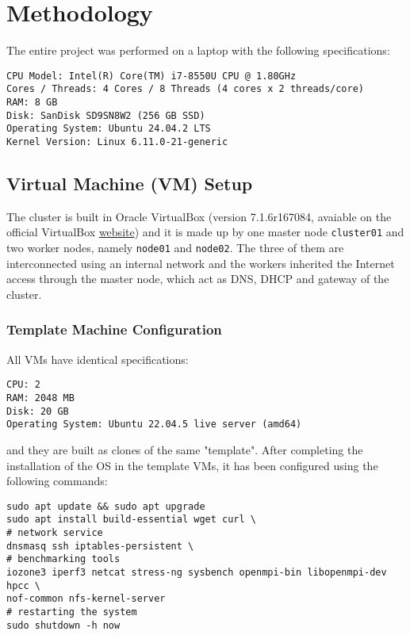 \section{Methodology}

The entire project was performed on a laptop with the following specifications:

\begin{verbatim}
CPU Model: Intel(R) Core(TM) i7-8550U CPU @ 1.80GHz
Cores / Threads: 4 Cores / 8 Threads (4 cores x 2 threads/core)
RAM: 8 GB
Disk: SanDisk SD9SN8W2 (256 GB SSD)
Operating System: Ubuntu 24.04.2 LTS
Kernel Version: Linux 6.11.0-21-generic
\end{verbatim}


\subsection{Virtual Machine (VM) Setup}

The cluster is built in Oracle VirtualBox (version 7.1.6r167084, avaiable on the official VirtualBox \href{https://www.virtualbox.org/}{website}) and it is made up by one master node \texttt{cluster01} and two worker nodes, namely \texttt{node01} and \texttt{node02}. The three of them are interconnected using an internal network and the workers inherited the Internet access through the master node, which act as DNS, DHCP and gateway of the cluster.

\subsubsection{Template Machine Configuration}

All VMs have identical specifications:
\begin{verbatim}
CPU: 2
RAM: 2048 MB
Disk: 20 GB
Operating System: Ubuntu 22.04.5 live server (amd64)
\end{verbatim}

and they are built as clones of the same "template". After completing the installation of the OS in the template VMs, it has been configured using the following commands:

\begin{verbatim}
sudo apt update && sudo apt upgrade
sudo apt install build-essential wget curl \
# network service
dnsmasq ssh iptables-persistent \
# benchmarking tools
iozone3 iperf3 netcat stress-ng sysbench openmpi-bin libopenmpi-dev hpcc \
nof-common nfs-kernel-server
# restarting the system
sudo shutdown -h now
\end{verbatim}

